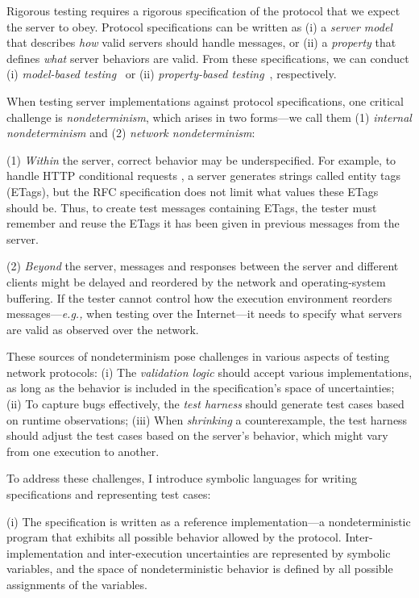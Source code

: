 \documentclass[12pt,oneside]{amsbook}
\numberwithin{section}{chapter}
\numberwithin{figure}{chapter}
\numberwithin{equation}{chapter}
\begin{document}
Rigorous testing requires a rigorous specification of the protocol that we
expect the server to obey.  Protocol specifications can be written as (i) a {\em
  server model} that describes {\em how} valid servers should handle messages,
or (ii) a {\em property} that defines {\em what} server behaviors are valid.
From these specifications, we can conduct (i) {\em model-based
  testing}~\cite{broy2005model} or (ii) {\em property-based testing}~\cite{pbt},
respectively.

When testing server implementations against protocol specifications, one
critical challenge is {\em nondeterminism}, which arises in two forms---we call
them (1) {\em internal nondeterminism} and (2) {\em network nondeterminism}:

(1) {\em Within} the server, correct behavior may be \mbox{underspecified}.
For example, to handle HTTP conditional requests \cite{rfc7232}, a server
generates strings called entity tags (ETags), but the RFC specification does
not limit {what} values these ETags should be.  Thus, to create test
messages containing ETags, the tester must remember and reuse the ETags it
has been given in previous messages from the server.

(2) {\em Beyond} the server, messages and responses between the server and
different clients might be delayed and reordered by the network and
operating-system buffering.  If the tester cannot control how the execution
environment reorders messages---{\it e.g.,} when testing over the Internet---it
needs to specify what servers are valid as observed over the network.

These sources of nondeterminism pose challenges in various aspects of testing network
protocols: (i) The {\em validation logic} should accept various implementations,
as long as the behavior is included in the specification's space of
uncertainties; (ii) To capture bugs effectively, the {\em test harness} should
generate test cases based on runtime observations; (iii) When {\em shrinking} a
counterexample, the test harness should adjust the test cases based on the
server's behavior, which might vary from one execution to another.

To address these challenges, I introduce symbolic languages for writing
specifications and representing test cases:

(i) The specification is written as a reference implementation---a
nondeterministic program that exhibits all possible behavior allowed by
the protocol.  Inter-implementation and inter-execution uncertainties are
represented by symbolic variables, and the space of nondeterministic behavior is
defined by all possible assignments of the variables.
\end{document}
